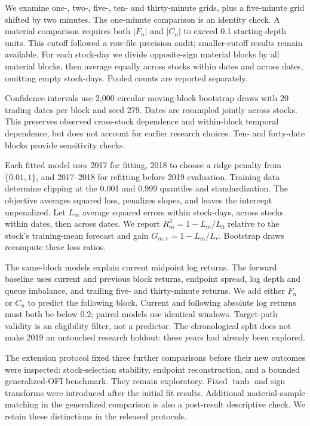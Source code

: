 \documentclass[11pt]{article}
\begin{document}
We examine one-, two-, five-, ten- and thirty-minute grids, plus a five-minute grid shifted by two minutes. The one-minute comparison is an identity check. A material comparison requires both $|F_n|$ and $|C_n|$ to exceed 0.1 starting-depth units. This cutoff followed a raw-file precision audit; smaller-cutoff results remain available. For each stock-day we divide opposite-sign material blocks by all material blocks, then average equally across stocks within dates and across dates, omitting empty stock-days. Pooled counts are reported separately.

Confidence intervals use 2,000 circular moving-block bootstrap draws with 20 trading dates per block and seed 279. Dates are resampled jointly across stocks. This preserves observed cross-stock dependence and within-block temporal dependence, but does not account for earlier research choices. Ten- and forty-date blocks provide sensitivity checks.

Each fitted model uses 2017 for fitting, 2018 to choose a ridge penalty from $\{0.01,1\}$, and 2017--2018 for refitting before 2019 evaluation. Training data determine clipping at the 0.001 and 0.999 quantiles and standardization. The objective averages squared loss, penalizes slopes, and leaves the intercept unpenalized. Let $L_m$ average squared errors within stock-days, across stocks within dates, then across dates. We report $R_m^2=1-L_m/L_0$ relative to the stock's training-mean forecast and gain $G_{m:r}=1-L_m/L_r$. Bootstrap draws recompute these loss ratios.

The same-block models explain current midpoint log returns. The forward baseline uses current and previous block returns, endpoint spread, log depth and queue imbalance, and trailing five- and thirty-minute returns. We add either $F_n$ or $C_n$ to predict the following block. Current and following absolute log returns must both be below 0.2; paired models use identical windows. Target-path validity is an eligibility filter, not a predictor. The chronological split does not make 2019 an untouched research holdout: these years had already been explored.

The extension protocol fixed three further comparisons before their new outcomes were inspected: stock-selection stability, endpoint reconstruction, and a bounded generalized-OFI benchmark. They remain exploratory. Fixed $\tanh$ and sign transforms were introduced after the initial fit results. Additional material-sample matching in the generalized comparison is also a post-result descriptive check. We retain these distinctions in the released protocols.
\end{document}
